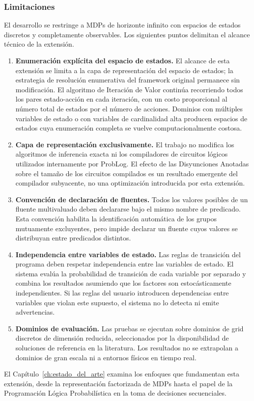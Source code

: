 \clearpage

\subsubsection{Limitaciones}
\label{subsec:limitaciones}

El desarrollo se restringe a MDPs de horizonte infinito con espacios de estados discretos y completamente observables. Los siguientes puntos delimitan el alcance técnico de la extensión.

\begin{enumerate}
    \item \textbf{Enumeración explícita del espacio de estados.} El alcance de esta extensión se limita a la capa de representación del espacio de estados; la estrategia de resolución enumerativa del framework original permanece sin modificación. El algoritmo de Iteración de Valor continúa recorriendo todos los pares estado-acción en cada iteración, con un costo proporcional al número total de estados por el número de acciones. Dominios con múltiples variables de estado o con variables de cardinalidad alta producen espacios de estados cuya enumeración completa se vuelve computacionalmente costosa.

    \item \textbf{Capa de representación exclusivamente.} El trabajo no modifica los algoritmos de inferencia exacta ni los compiladores de circuitos lógicos utilizados internamente por ProbLog. El efecto de las Disyunciones Anotadas sobre el tamaño de los circuitos compilados es un resultado emergente del compilador subyacente, no una optimización introducida por esta extensión.

    \item \textbf{Convención de declaración de fluentes.} Todos los valores posibles de un fluente multivaluado deben declararse bajo el mismo nombre de predicado. Esta convención habilita la identificación automática de los grupos mutuamente excluyentes, pero impide declarar un fluente cuyos valores se distribuyan entre predicados distintos.

    \item \textbf{Independencia entre variables de estado.} Las reglas de transición del programa deben respetar independencia entre las variables de estado. El sistema evalúa la probabilidad de transición de cada variable por separado y combina los resultados asumiendo que los factores son estocásticamente independientes. Si las reglas del usuario introducen dependencias entre variables que violan este supuesto, el sistema no lo detecta ni emite advertencias.

    \item \textbf{Dominios de evaluación.} Las pruebas se ejecutan sobre dominios de grid discretos de dimensión reducida, seleccionados por la disponibilidad de soluciones de referencia en la literatura. Los resultados no se extrapolan a dominios de gran escala ni a entornos físicos en tiempo real.
\end{enumerate}

El Capítulo~\ref{ch:estado_del_arte} examina los enfoques que fundamentan esta extensión, desde la representación factorizada de MDPs hasta el papel de la Programación Lógica Probabilística en la toma de decisiones secuenciales.